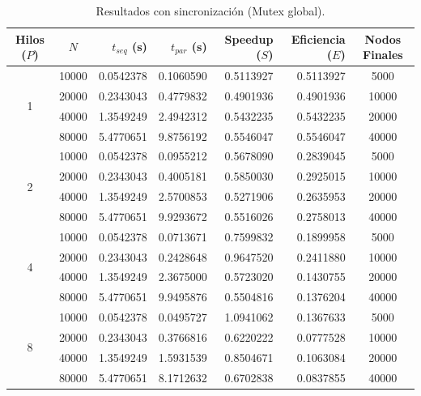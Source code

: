 \documentclass[11pt,a4paper]{article}
\begin{document}
\begin{table}[htbp]
\centering
\caption{Resultados con sincronización (Mutex global).}
\label{tab:resultados_lista_sync}
\small
\begin{tabular}{ccrrrrc}
\toprule
\textbf{Hilos ($P$)} & \textbf{$N$} & \textbf{$t_{seq}$ (s)} & \textbf{$t_{par}$ (s)} & \textbf{Speedup ($S$)} & \textbf{Eficiencia ($E$)} & \textbf{Nodos Finales} \\
\midrule
\multirow{4}{*}{1} 
 & 10000 & 0.0542378 & 0.1060590 & 0.5113927 & 0.5113927 & 5000 \\
 & 20000 & 0.2343043 & 0.4779832 & 0.4901936 & 0.4901936 & 10000 \\
 & 40000 & 1.3549249 & 2.4942312 & 0.5432235 & 0.5432235 & 20000 \\
 & 80000 & 5.4770651 & 9.8756192 & 0.5546047 & 0.5546047 & 40000 \\
\midrule
\multirow{4}{*}{2} 
 & 10000 & 0.0542378 & 0.0955212 & 0.5678090 & 0.2839045 & 5000 \\
 & 20000 & 0.2343043 & 0.4005181 & 0.5850030 & 0.2925015 & 10000 \\
 & 40000 & 1.3549249 & 2.5700853 & 0.5271906 & 0.2635953 & 20000 \\
 & 80000 & 5.4770651 & 9.9293672 & 0.5516026 & 0.2758013 & 40000 \\
\midrule
\multirow{4}{*}{4} 
 & 10000 & 0.0542378 & 0.0713671 & 0.7599832 & 0.1899958 & 5000 \\
 & 20000 & 0.2343043 & 0.2428648 & 0.9647520 & 0.2411880 & 10000 \\
 & 40000 & 1.3549249 & 2.3675000 & 0.5723020 & 0.1430755 & 20000 \\
 & 80000 & 5.4770651 & 9.9495876 & 0.5504816 & 0.1376204 & 40000 \\
\midrule
\multirow{4}{*}{8} 
 & 10000 & 0.0542378 & 0.0495727 & 1.0941062 & 0.1367633 & 5000 \\
 & 20000 & 0.2343043 & 0.3766816 & 0.6220222 & 0.0777528 & 10000 \\
 & 40000 & 1.3549249 & 1.5931539 & 0.8504671 & 0.1063084 & 20000 \\
 & 80000 & 5.4770651 & 8.1712632 & 0.6702838 & 0.0837855 & 40000 \\
\bottomrule
\end{tabular}
\end{table}
\end{document}
